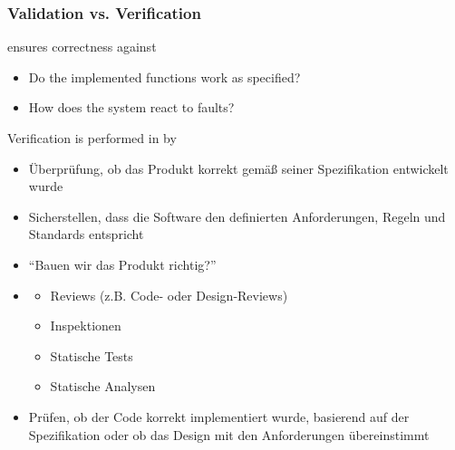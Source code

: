 \subsubsection*{Validation vs. Verification}
\begin{defBox}[title=Verification]
     ensures correctness against 
    \begin{center}
    \end{center}
    \begin{itemize}
        \item Do the implemented functions work as specified?
        \item How does the system react to faults?
    \end{itemize}
\end{defBox}
\begin{defBox}
    Verification is performed in  by 
\end{defBox}
\begin{infoBox}[title=Verification]
    \begin{itemize}
        \item {} Überprüfung, ob das Produkt korrekt gemäß seiner Spezifikation entwickelt wurde
        \item {} Sicherstellen, dass die Software den definierten Anforderungen, Regeln und Standards entspricht
        \item {} \enquote{Bauen wir das Produkt richtig?}
        \item {}
        \begin{itemize}
            \item Reviews (z.B. Code- oder Design-Reviews)
            \item Inspektionen
            \item Statische Tests
            \item Statische Analysen
        \end{itemize}
        \item {} Prüfen, ob der Code korrekt implementiert wurde, basierend auf der Spezifikation oder ob das Design mit den Anforderungen übereinstimmt
    \end{itemize}
\end{infoBox}
